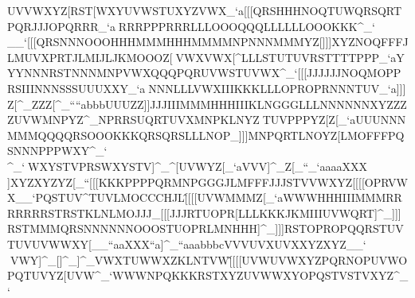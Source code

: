 UVVWXYZ[RST[\]WXYUVWSTUXYZVWX_`a                                                            [[[QRSHHHNOQTUWQRSQRTPQRJJJOPQRRR_`a                                                            ^^^RRRPPPRRRLLLOOOQQQLLLLLLOOOKKK^_`                                                            \\__`                                                            [[[QRSNNNOOOHHHMMMHHHMMMMNPNNNMMMYZ[                                                            ]]]XYZNOQFFFJLMUVXPRTJLMIJLJKMOOOZ[\                                                            ^^^VWXVWX[\]\]^LLLSTUTUVRSTTTTPPP_`a                                                            YYYNNNRSTNNNMNPVWXQQQPQRUVWSTUVWX^_`                                                            [[[JJJJJJNOQMOPPRSIIINNNSSSUUUXXY_`a                                                            ^^^NNNLLLVWXIIIKKKLLLOPROPRNNNTUV_`a                                                            ]]]Z[\Z[\Z[\UVXQRTSTUWXY\]^\]^UVW]^_                                                            ZZZ[\]\]^_````abbbUUUZZ\Z[\[\]WXY_``                                                            ]]]JJJIIIMMMHHHIIIKLNGGGLLLNNNNNNXYZ                                                            ZZZUVWMNPYZ\]^_NPRRSUQRTUVXMNPKLNYZ\                                                            ^^^TUVPPPYZ[Z[\NNNLMOHHHPPPOOOWXY_`a                                                            UUUNNNMMMQQQQRSOOOKKKQRSQRSLLLNOP\]_                                                            ]]]MNPQRTLNOYZ[LMOFFFPQSNNNPPPWXY^_`                                                            \\\NNNMNPUVWMMMNOQOPRRSTNNNQRTMNP^_`                                                            ^^^WXYSTVPRSWXYSTV]^_\]^[\]UVWYZ[_`a                                                            VVV]^_Z[\_``_`aaaaXXX\\]XYZXYZYZ[_``                                                            [[[KKKPPPPQRMNPGGGJLMFFFJJJSTVVWXYZ[                                                            [[[OPRVWX__`PQSTUV\]^TUVLMOCCCHJL[\^                                                            [[[UVWMMMZ[\UVWNNNMNPKLNHHHTUVXYY_`a                                                            WWWHHHIIIMMMRRRRRRRSTRSTKLNLMOJJJ\]_                                                            [[[JJJRTUOPR[\]LLLKKKJKMIIIUVWQRT]^_                                                            ]]]RSTMMMQRSNNNNNNOOOSTUOPRLMNHHH]^_                                                            ]]]RSTOPROPQQRSTUVTUVUVWWXY[\]__``aa                                                            XXX``a]^_``aaabbbcVVVUVXUVXXYZXYZ__`                                                            \\\QRTTUVLLLJJJLMNIIIOPRTUWWXYJKMVXY                                                            ^^^VWY]^_[\]]^_]^_VWXTUWWXZKLNTVW[\^                                                            [[[UVWUVWXYZPQRNOPUVWOPQTUVYZ[UVW^_`                                                            WWWNPQKKKRSTXYZUVWWXYOPQSTVSTVXYZ^_`    
